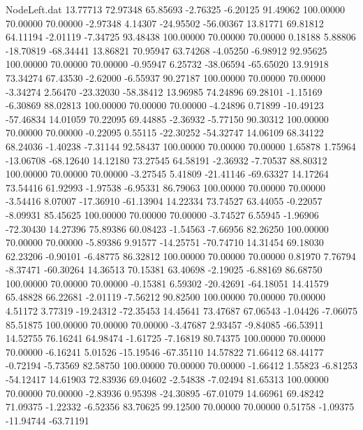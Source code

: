 \begin{filecontents}{NodeLeft.dat}
  13.77713   72.97348   65.85693    -2.76325   -6.20125   91.49062  100.00000   70.00000   70.00000   -2.97348    4.14307  -24.95502  -56.00367
  13.81771   69.81812   64.11194    -2.01119   -7.34725   93.48438  100.00000   70.00000   70.00000    0.18188    5.88806  -18.70819  -68.34441
  13.86821   70.95947   63.74268    -4.05250   -6.98912   92.95625  100.00000   70.00000   70.00000   -0.95947    6.25732  -38.06594  -65.65020
  13.91918   73.34274   67.43530    -2.62000   -6.55937   90.27187  100.00000   70.00000   70.00000   -3.34274    2.56470  -23.32030  -58.38412
  13.96985   74.24896   69.28101    -1.15169   -6.30869   88.02813  100.00000   70.00000   70.00000   -4.24896    0.71899  -10.49123  -57.46834
  14.01059   70.22095   69.44885    -2.36932   -5.77150   90.30312  100.00000   70.00000   70.00000   -0.22095    0.55115  -22.30252  -54.32747
  14.06109   68.34122   68.24036    -1.40238   -7.31144   92.58437  100.00000   70.00000   70.00000    1.65878    1.75964  -13.06708  -68.12640
  14.12180   73.27545   64.58191    -2.36932   -7.70537   88.80312  100.00000   70.00000   70.00000   -3.27545    5.41809  -21.41146  -69.63327
  14.17264   73.54416   61.92993    -1.97538   -6.95331   86.79063  100.00000   70.00000   70.00000   -3.54416    8.07007  -17.36910  -61.13904
  14.22334   73.74527   63.44055    -0.22057   -8.09931   85.45625  100.00000   70.00000   70.00000   -3.74527    6.55945   -1.96906  -72.30430
  14.27396   75.89386   60.08423    -1.54563   -7.66956   82.26250  100.00000   70.00000   70.00000   -5.89386    9.91577  -14.25751  -70.74710
  14.31454   69.18030   62.23206    -0.90101   -6.48775   86.32812  100.00000   70.00000   70.00000    0.81970    7.76794   -8.37471  -60.30264
  14.36513   70.15381   63.40698    -2.19025   -6.88169   86.68750  100.00000   70.00000   70.00000   -0.15381    6.59302  -20.42691  -64.18051
  14.41579   65.48828   66.22681    -2.01119   -7.56212   90.82500  100.00000   70.00000   70.00000    4.51172    3.77319  -19.24312  -72.35453
  14.45641   73.47687   67.06543    -1.04426   -7.06075   85.51875  100.00000   70.00000   70.00000   -3.47687    2.93457   -9.84085  -66.53911
  14.52755   76.16241   64.98474    -1.61725   -7.16819   80.74375  100.00000   70.00000   70.00000   -6.16241    5.01526  -15.19546  -67.35110
  14.57822   71.66412   68.44177    -0.72194   -5.73569   82.58750  100.00000   70.00000   70.00000   -1.66412    1.55823   -6.81253  -54.12417
  14.61903   72.83936   69.04602    -2.54838   -7.02494   81.65313  100.00000   70.00000   70.00000   -2.83936    0.95398  -24.30895  -67.01079
  14.66961   69.48242   71.09375    -1.22332   -6.52356   83.70625   99.12500   70.00000   70.00000    0.51758   -1.09375  -11.94744  -63.71191

\end{filecontents}
